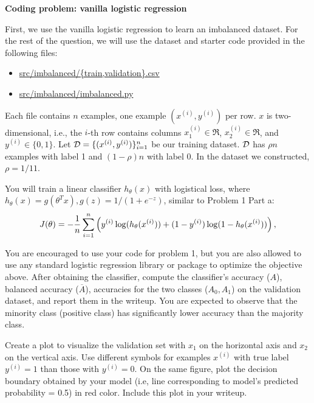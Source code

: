 \item {} \textbf{Coding problem: vanilla logistic regression}

First, we use the vanilla logistic regression to learn an imbalanced dataset. For the rest of the question, we will use the dataset and starter code provided in
the following files:
%
\begin{center}
	\begin{itemize}
		\item	\url{src/imbalanced/{train,validation}.csv}
		\item   \url{src/imbalanced/imbalanced.py}
	\end{itemize}
\end{center}


Each file contains $n$ examples, one example $(x^{(i)}, y^{(i)})$ per row. $x$ is two-dimensional, i.e., the $i$-th row contains columns $x^{(i)}_1\in\Re$,
$x^{(i)}_2\in\Re$, and $y^{(i)}\in\{0, 1\}$. Let $\mathcal{D}=\{(x^{(i)}, y^{(i)})\}_{i=1}^n$ be our training dataset. $\mathcal{D}$ has $\rho n$ examples with label 1 and $(1-\rho)n$ with label 0. In the dataset we constructed, $\rho=1/11$.

You will train a linear classifier $h_{\theta}(x)$ with logistical loss, where $h_\theta(x)=g(\theta^T x), g(z)=1/(1+e^{-z})$, similar to Problem 1 Part a:
\begin{align*}
J(\theta) = -\frac{1}{{n}} \sum_{i=1}^{n} \left(y^{(i)}\log(h_{\theta}(x^{(i)}))
+  (1 - y^{(i)})\log(1 - h_{\theta}(x^{(i)}))\right), 
\end{align*}

You are encouraged to use your code for problem 1, but you are also allowed to use  any standard logistic regression library or package to optimize the objective above. After obtaining the classifier, 
compute the classifier's accuracy ($A$), balanced accuracy ($\overline{A}$), accuracies for the two classes ($A_0, A_1$) on the validation dataset, and report them in the writeup. You are expected to observe that the minority class (positive class) has significantly lower accuracy than the majority class. 


Create a plot to visualize the validation set with $x_1$ on the horizontal axis and $x_2$ on
the vertical axis. Use different symbols for examples $x^{(i)}$ with true label $y^{(i)} = 1$
than those with $y^{(i)} = 0$. On the same figure, plot the decision boundary obtained
by your model (i.e, line corresponding to model's predicted probability = 0.5) in red color. Include
this plot in your writeup.
